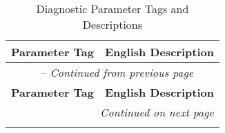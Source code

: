 \documentclass{article}
\begin{document}
{ %
\renewcommand{\arraystretch}{1.1} %

\begin{longtable}{|l|p{}|} %

\caption{Diagnostic Parameter Tags and Descriptions}%
\label{tab:diagnostic_tags}\\ %
\hline %
\textbf{Parameter Tag} & \textbf{English Description} \\ %
\hline %
\endfirsthead %

\hline %
\multicolumn{2}{|c|}{\tablename\ \thetable{} -- \textit{Continued from previous page}} \\ %
\hline %
\textbf{Parameter Tag} & \textbf{English Description} \\ %
\hline %
\endhead %

\hline %
\multicolumn{2}{|r|}{\textit{Continued on next page}} \\ %
\endfoot %

\hline %
\endlastfoot %


\end{longtable}}
\end{document}

